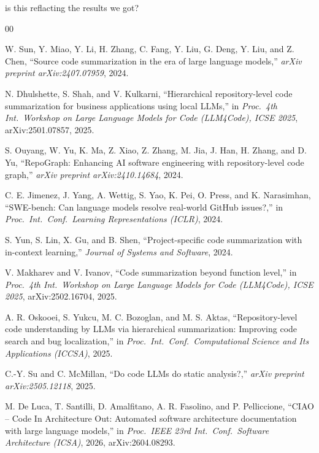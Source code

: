 is this reflacting the results we got?\documentclass[conference]{IEEEtran}
\begin{document}

\begin{thebibliography}{00}

W. Sun, Y. Miao, Y. Li, H. Zhang, C. Fang, Y. Liu, G. Deng, Y. Liu, and Z. Chen,
``Source code summarization in the era of large language models,''
\emph{arXiv preprint arXiv:2407.07959}, 2024.

N. Dhulshette, S. Shah, and V. Kulkarni,
``Hierarchical repository-level code summarization for business applications using local LLMs,''
in \emph{Proc.\ 4th Int.\ Workshop on Large Language Models for Code (LLM4Code), ICSE 2025},
arXiv:2501.07857, 2025.

S. Ouyang, W. Yu, K. Ma, Z. Xiao, Z. Zhang, M. Jia, J. Han, H. Zhang, and D. Yu,
``RepoGraph: Enhancing AI software engineering with repository-level code graph,''
\emph{arXiv preprint arXiv:2410.14684}, 2024.

C. E. Jimenez, J. Yang, A. Wettig, S. Yao, K. Pei, O. Press, and K. Narasimhan,
``SWE-bench: Can language models resolve real-world GitHub issues?,''
in \emph{Proc.\ Int.\ Conf.\ Learning Representations (ICLR)}, 2024.

S. Yun, S. Lin, X. Gu, and B. Shen,
``Project-specific code summarization with in-context learning,''
\emph{Journal of Systems and Software}, 2024.

V. Makharev and V. Ivanov,
``Code summarization beyond function level,''
in \emph{Proc.\ 4th Int.\ Workshop on Large Language Models for Code (LLM4Code), ICSE 2025},
arXiv:2502.16704, 2025.

A. R. Oskooei, S. Yukcu, M. C. Bozoglan, and M. S. Aktas,
``Repository-level code understanding by LLMs via hierarchical summarization: Improving code
search and bug localization,''
in \emph{Proc.\ Int.\ Conf.\ Computational Science and Its Applications (ICCSA)}, 2025.

C.-Y. Su and C. McMillan,
``Do code LLMs do static analysis?,''
\emph{arXiv preprint arXiv:2505.12118}, 2025.

M. De Luca, T. Santilli, D. Amalfitano, A. R. Fasolino, and P. Pelliccione,
``CIAO -- Code In Architecture Out: Automated software architecture documentation with large
language models,''
in \emph{Proc.\ IEEE 23rd Int.\ Conf.\ Software Architecture (ICSA)}, 2026, arXiv:2604.08293.


\end{thebibliography}
\end{document}
